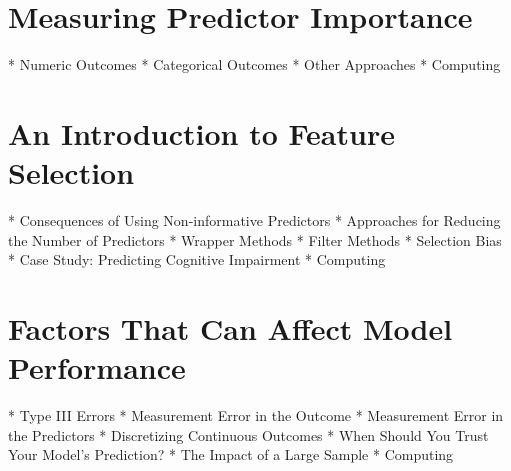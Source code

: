 \section{Measuring Predictor Importance} 
  
* Numeric Outcomes  
* Categorical Outcomes 
* Other Approaches  
* Computing 
 
\section{An Introduction to Feature Selection}  

* Consequences of Using Non-informative Predictors 
* Approaches for Reducing the Number of Predictors 
* Wrapper Methods  
* Filter Methods 
* Selection Bias 
* Case Study: Predicting Cognitive Impairment  
* Computing 
 
\section{Factors That Can Affect Model Performance}  

* Type III Errors 
* Measurement Error in the Outcome  
* Measurement Error in the Predictors  
* Discretizing Continuous Outcomes 
* When Should You Trust Your Model’s Prediction? 
* The Impact of a Large Sample 
* Computing 
 
